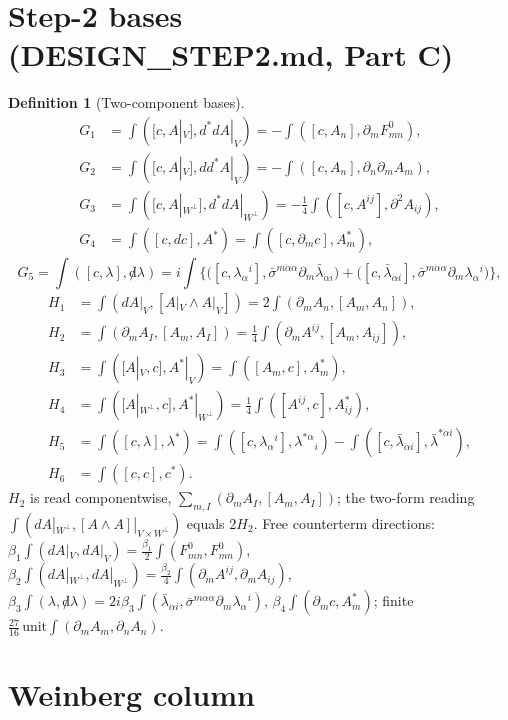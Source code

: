 \documentclass[11pt]{article}
\theoremstyle{definition}
\newtheorem{definition}{Definition}[section]
\begin{document}
\section{Step-2 bases (DESIGN\_STEP2.md, Part C)}

\begin{definition}[Two-component bases]\label{def:bases}
\begin{align*}
G_1&=\int([c,A|_V],d^*dA|_V)=-\int([c,A_n],\partial_mF^0_{mn}),\\
G_2&=\int([c,A|_V],dd^*A|_V)=-\int([c,A_n],\partial_n\partial_mA_m),\\
G_3&=\int([c,A|_{W^\perp}],d^*dA|_{W^\perp})=-\tfrac14\int([c,A^{ij}],\partial^2A_{ij}),\\
G_4&=\int([c,dc],A^*)=\int([c,\partial_mc],A^*_m),
\end{align*}
\[
G_5=\int([c,\lambda],{\not d}\lambda)=i\int\Big\{\big([c,\lambda_\alpha{}^i],\bar\sigma^{m\dot\alpha\alpha}\partial_m\bar\lambda_{\dot\alpha i}\big)+\big([c,\bar\lambda_{\dot\alpha i}],\bar\sigma^{m\dot\alpha\alpha}\partial_m\lambda_\alpha{}^i\big)\Big\},
\]
\begin{align*}
H_1&=\int(dA|_V,[A|_V\wedge A|_V])=2\int(\partial_mA_n,[A_m,A_n]),\\
H_2&=\int(\partial_mA_I,[A_m,A_I])=\tfrac14\int(\partial_mA^{ij},[A_m,A_{ij}]),\\
H_3&=\int([A|_V,c],A^*|_V)=\int([A_m,c],A^*_m),\\
H_4&=\int([A|_{W^\perp},c],A^*|_{W^\perp})=\tfrac14\int([A^{ij},c],A^*_{ij}),\\
H_5&=\int([c,\lambda],\lambda^*)=\int([c,\lambda_\alpha{}^i],\lambda^{*\alpha}{}_i)-\int([c,\bar\lambda_{\dot\alpha i}],\bar\lambda^{*\dot\alpha i}),\\
H_6&=\int([c,c],c^*).
\end{align*}
$H_2$ is read componentwise, $\sum_{m,I}(\partial_mA_I,[A_m,A_I])$; the two-form reading $\int(dA|_{W^\perp},[A\wedge A]|_{V\times W^\perp})$ equals $2H_2$. Free counterterm directions: $\beta_1\int(dA|_V,dA|_V)=\tfrac{\beta_1}2\int(F^0_{mn},F^0_{mn})$, $\beta_2\int(dA|_{W^\perp},dA|_{W^\perp})=\tfrac{\beta_2}4\int(\partial_mA^{ij},\partial_mA_{ij})$, $\beta_3\int(\lambda,{\not d}\lambda)=2i\beta_3\int(\bar\lambda_{\dot\alpha i},\bar\sigma^{m\dot\alpha\alpha}\partial_m\lambda_\alpha{}^i)$, $\beta_4\int(\partial_mc,A^*_m)$; finite $\tfrac{27}{16}\,\text{unit}\int(\partial_mA_m,\partial_nA_n)$.
\end{definition}

\section{Weinberg column}
\end{document}
